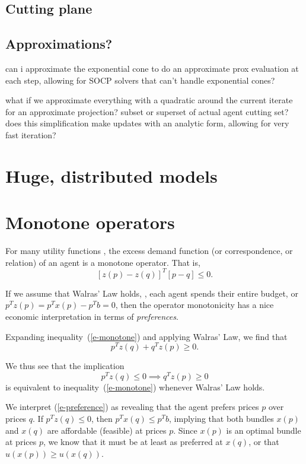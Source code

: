 \documentclass{article}
\begin{document}
\subsection{Cutting plane}
\subsection{Approximations?}
can i approximate the exponential cone to do an approximate prox evaluation
at each step, allowing for SOCP solvers that can't handle exponential cones?

what if we approximate everything with a quadratic around the current iterate for an approximate projection? subset or superset of actual agent cutting set? does this simplification make updates with an analytic form, allowing for very fast iteration?

\section{Huge, distributed models}

\section{Monotone operators}
For many utility functions , the excess demand function (or correspondence,
or relation) of an agent is a
monotone operator.
That is,
\begin{equation}
\label{e-monotone}
\left[z(p) - z(q) \right]^T \left[p - q\right] \leq 0.
\end{equation}

If we assume that Walras' Law holds, \ie, each agent spends their entire
budget, or $p^T z(p) = p^T x(p) - p^T b = 0$, then the operator monotonicity has
a nice economic interpretation in terms of \emph{preferences}.

Expanding inequality~(\ref{e-monotone}) and applying Walras' Law, we find that
\[
p^T z(q) + q^T z(p) \geq 0.
\]

We thus see that the implication
\begin{equation}
\label{e-preference}
p^T z(q) \leq 0 \implies q^T z(p) \geq 0
\end{equation}
is equivalent to inequality~(\ref{e-monotone}) whenever Walras' Law holds.

We interpret (\ref{e-preference}) as revealing that the agent prefers prices
$p$ over prices $q$. If $p^T z(q) \leq 0$, then $p^T x(q) \leq p^T b$, implying
that both bundles $x(p)$ and $x(q)$ are affordable (feasible) at prices $p$.
Since $x(p)$ is an optimal bundle at prices $p$, we know that it must be at least
as preferred at $x(q)$, or that $u(x(p)) \geq u(x(q))$.
\end{document}
